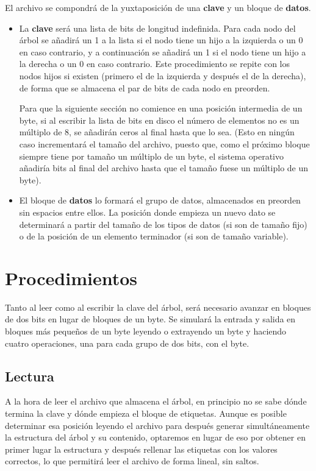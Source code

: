 \documentclass{article}
\begin{document}
El archivo se compondrá de la yuxtaposición de una \textbf{clave} y un
bloque de \textbf{datos}.

\begin{itemize}
	\item La \textbf{clave} será una lista de bits de longitud indefinida.
  Para cada nodo del árbol se añadirá un 1 a la lista si el nodo tiene un hijo a
  la izquierda o un 0 en caso contrario, y a continuación se añadirá un 1 si el
  nodo tiene un hijo a la derecha o un 0 en caso contrario. Este procedimiento
  se repite con los nodos hijos si existen (primero el de la izquierda y después
  el de la derecha), de forma que se almacena el par de bits de cada nodo en preorden.

  Para que la siguiente sección no comience en una posición intermedia de un byte,
  si al escribir la lista de bits en disco el número de elementos no es un múltiplo
  de 8, se añadirán ceros al final hasta que lo sea. (Esto en ningún caso
  incrementará el tamaño del archivo, puesto que, como el próximo bloque siempre
  tiene por tamaño un múltiplo de un byte, el sistema operativo añadiría bits al
  final del archivo hasta que el tamaño fuese un múltiplo de un byte).
	\item El bloque de \textbf{datos} lo formará el grupo de datos, almacenados
  en preorden sin espacios entre ellos. La posición donde empieza un nuevo dato
  se determinará a partir del tamaño de los tipos de datos (si son de tamaño fijo)
  o de la posición de un elemento terminador (si son de tamaño variable).
\end{itemize}

\section{Procedimientos}

Tanto al leer como al escribir la clave del árbol, será necesario avanzar en 
bloques de dos bits en lugar de bloques de un byte. Se simulará la entrada y salida
en bloques más pequeños de un byte leyendo o extrayendo un byte y haciendo cuatro
operaciones, una para cada grupo de dos bits, con el byte.

\subsection{Lectura}

A la hora de leer el archivo que almacena el árbol, en principio no se sabe dónde
termina la clave y dónde empieza el bloque de etiquetas. Aunque es posible 
determinar esa posición leyendo el archivo para después generar simultáneamente la 
estructura del árbol y su contenido, optaremos en lugar de eso por obtener en
primer lugar la estructura y después rellenar las etiquetas con los valores
correctos, lo que permitirá leer el archivo de forma lineal, sin saltos. \\
\end{document}
